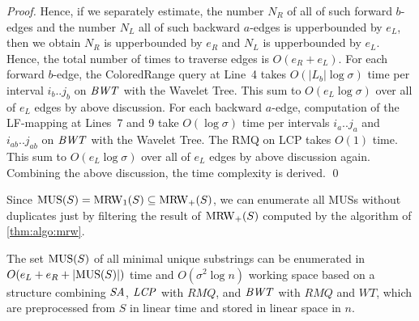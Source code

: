 \begin{proof}
Hence, if we separately estimate, the number $N_R$ of all of such forward $b$-edges and the number $N_L$ all of such backward $a$-edges is upperbounded by $e_L$, then we obtain $N_R$ is upperbounded by $e_R$ and $N_L$ is upperbounded by $e_L$. Hence, the total number of times to traverse edges is $O(e_R + e_L)$.
For each forward $b$-edge, the ColoredRange query at Line~4 takes $O(|L_b| \log\sigma)$ time per interval $i_b..j_b$ on $\mathit{BWT}$ with the Wavelet Tree. This sum to $O(e_L \log\sigma)$ over all of $e_L$ edges by above discussion. 
For each backward $a$-edge, computation of the LF-mapping at Lines~7 and 9 take $O(\log\sigma)$ time per intervals $i_a..j_a$ and $i_{ab}..j_{ab}$ on $\mathit{BWT}$ with the Wavelet Tree. The RMQ on LCP takes $O(1)$ time.
This sum to $O(e_L \log\sigma)$ over all of $e_L$ edges by above discussion again. Combining the above discussion, the time complexity is derived. 
\qed 
\end{proof}


  Since $\mathrm{MUS}(S) = \mathrm{MRW}_1(S) \subseteq \mathrm{MRW}_+(S)$, we can enumerate all MUSs without duplicates just by filtering the result of $\mathrm{MRW}_+(S)$ computed by the algorithm of  \cref{thm:algo:mrw}.  

\begin{corollary}\label{thm:algo:mus:ebf}
The set $\mathrm{MUS}(S)$ of all minimal unique substrings can be enumerated in $O(e_L + e_R + |\mathrm{MUS}(S)|)$ time and $O(\sigma^2\log n)$ working space
  based on a structure combining $\mathit{SA}$, $\mathit{LCP}$ with $RMQ$, and $\mathit{BWT}$ with $RMQ$ and $WT$,  which are preprocessed from $S$ in linear time and stored in linear space in $n$. 
\end{corollary}

